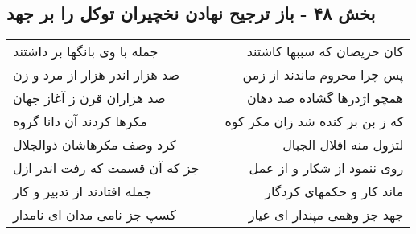 \begin{center}
\section*{بخش ۴۸ - باز ترجیح نهادن نخچیران توکل را بر جهد}
\label{sec:sh048}
\begin{longtable}{l p{0.5cm} r}
جمله با وی بانگها بر داشتند
&&
کان حریصان که سببها کاشتند
\\
صد هزار اندر هزار از مرد و زن
&&
پس چرا محروم ماندند از زمن
\\
صد هزاران قرن ز آغاز جهان
&&
همچو اژدرها گشاده صد دهان
\\
مکرها کردند آن دانا گروه
&&
که ز بن بر کنده شد زان مکر کوه
\\
کرد وصف مکرهاشان ذوالجلال
&&
لتزول منه اقلال الجبال
\\
جز که آن قسمت که رفت اندر ازل
&&
روی ننمود از شکار و از عمل
\\
جمله افتادند از تدبیر و کار
&&
ماند کار و حکمهای کردگار
\\
کسپ جز نامی مدان ای نامدار
&&
جهد جز وهمی مپندار ای عیار
\\
\end{longtable}
\end{center}
